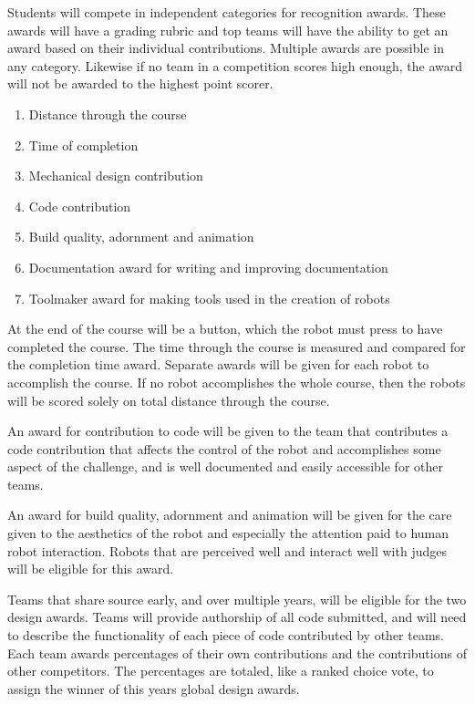 \documentclass{article}
\begin{document}
Students will compete in independent categories for recognition awards. These awards will have a grading rubric and top teams will have the ability to get an award based on their individual contributions. Multiple awards are possible in any category. Likewise if no team in a competition scores high enough, the award will not be awarded to the highest point scorer. 

\begin{enumerate}
	
\item Distance through the course
 
\item Time of completion
 
\item Mechanical design contribution
 
\item Code contribution
 
 \item Build quality, adornment and animation
 
 \item Documentation award for writing and improving documentation
 
 \item Toolmaker award for making tools used in the creation of robots
 
\end{enumerate}

 At the end of the course will be a button, which the robot must press to have completed the course. The time through the course is measured and compared for the completion time award. Separate awards will be given for each robot to accomplish the course. If no robot accomplishes the whole course, then the robots will be scored solely on total distance through the course. 
 
 An award for contribution to code will be given to the team that contributes a code contribution that affects the control of the robot and accomplishes some aspect of the challenge, and is well documented and easily accessible for other teams.
 
 An award for build quality, adornment and animation will be given for the care given to the aesthetics of the robot and especially the attention paid to human robot interaction. Robots that are perceived well and interact well with judges will be eligible for this award. 
 
  Teams that share source early, and over multiple years, will be eligible for the two design awards. Teams will provide authorship of all code submitted, and will need to describe the functionality of each piece of code contributed by other teams. Each team awards percentages of their own contributions and the contributions of other competitors. The percentages are totaled, like a ranked choice vote, to assign the winner of this years global design awards. 
  
\end{document}
